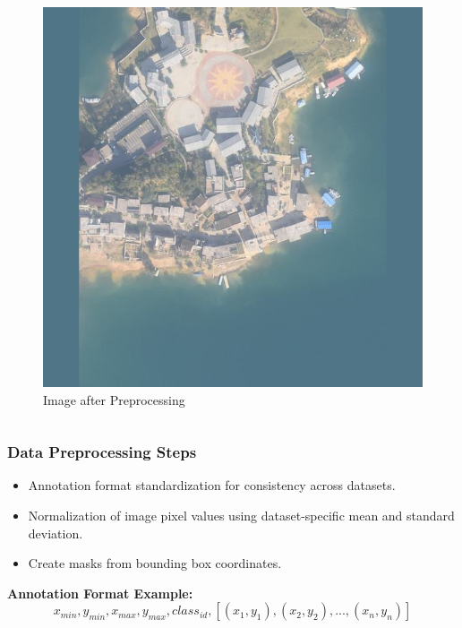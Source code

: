 \documentclass{beamer}
\begin{document}
\begin{frame}[t]
\begin{columns}
\begin{column}{0.5\textwidth}
    \begin{figure}
      \includegraphics[scale=0.15]{Figures/uav_example_cropped.jpg}
      \caption{Image after Preprocessing}
      \label{fig:post-pre-process}
    \end{figure}
  \end{column}
\end{columns}

\end{frame}


\begin{frame}[t]
  \frametitle{Data Preprocessing Steps}
  \begin{itemize}
    \item Annotation format standardization for consistency across datasets.
    \item Normalization of image pixel values using dataset-specific mean and standard deviation.
    \item Create masks from bounding box coordinates.
  \end{itemize}
  \vspace{1cm}
  \textbf{Annotation Format Example:}
  \[x_{min}, y_{min}, x_{max}, y_{max}, class_{id}, [(x_1, y_1), (x_2, y_2), ..., (x_n, y_n)]\]

\end{frame}
\end{document}
